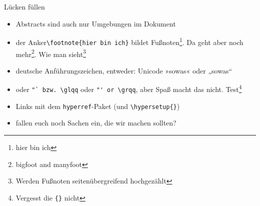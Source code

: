 \begin{frame}[fragile]{Lücken füllen}

\begin{itemize}[<+->]
    \item Abstracts sind auch nur Umgebungen im Dokument
    \item der Anker\lstinline|\footnote{hier bin ich}| bildet Fußnoten\footnote{hier bin ich}. Da geht aber noch mehr\footnote{bigfoot and manyfoot}. Wie man sieht\footnote{Werden Fußnoten seitenübergreifend hochgezählt}
    \item deutsche Anführungszeichen, entweder: Unicode »sowas« oder „sowas“
    \item oder \lstinline|"` bzw. \glqq| oder \lstinline|"' or \grqq|, aber Spaß macht das nicht. \glqq{}Test\grqq{}\footnote{Vergesst die \texttt{\{\}} nicht}
    \item Links mit dem \texttt{hyperref}-Paket (und \lstinline|\hypersetup{}|)
    \item fallen euch noch Sachen ein, die wir machen sollten?
\end{itemize}

\end{frame}
